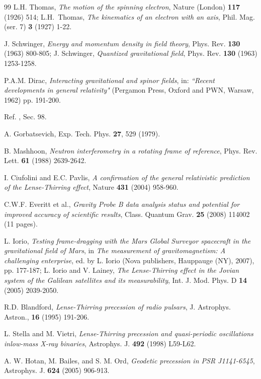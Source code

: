 \documentclass[preprint,showpacs,preprintnumbers,amsmath,amssymb]{revtex4}
\begin{document}
\begin{thebibliography}{99}
L.H. Thomas, {\it The motion of the spinning electron},
Nature (London) {\bf 117} (1926) 514; L.H.~Thomas, 
{\it The kinematics of an electron with an axis},
Phil. Mag. (ser. 7) {\bf 3} (1927) 1-22.

J. Schwinger,
{\it Energy and momentum density in field theory},
Phys. Rev. {\bf 130} (1963) 800-805;
J. Schwinger,
{\it Quantized gravitational field},
Phys. Rev. {\bf 130} (1963) 1253-1258.

P.A.M. Dirac,
{\it Interacting gravitational and spinor fields},
in: {\sl ``Recent developments in general relativity"}
(Pergamon Press, Oxford and PWN, Warsaw, 1962) pp. 191-200.

Ref. \cite{LL}, Sec. 98.

A. Gorbatsevich, Exp. Tech. Phys. {\bf 27}, 529 (1979).

B. Mashhoon,
{\it Neutron interferometry in a rotating frame of reference},
Phys. Rev. Lett. {\bf 61} (1988) 2639-2642.

I. Ciufolini and E.C. Pavlis,
{\it A confirmation of the general
relativistic prediction of the Lense-Thirring effect},
Nature \textbf{431} (2004) 958-960.

C.W.F. Everitt et al.,
{\it Gravity Probe B data analysis status and potential for 
improved accuracy of scientific results},
Class. Quantum Grav. \textbf{25} (2008) 114002 (11 pages).

L. Iorio, {\it Testing frame-dragging with the Mars Global 
Surveyor spacecraft in the gravitational field of Mars}, 
in \emph{The measurement of gravitomagnetism: A
challenging enterprise}, ed. by L. Iorio (Nova publishers,
Hauppauge (NY), 2007), pp. 177-187;
L. Iorio and V. Lainey,
{\it The Lense-Thirring effect in the Jovian system
of the Galilean satellites and its measurability},
Int. J. Mod. Phys. D \textbf{14} (2005) 2039-2050.

R.D. Blandford,
{\it Lense-Thirring precession of radio pulsars},
J. Astrophys. Astron., \textbf{16} (1995) 191-206.

L. Stella and M. Vietri,
{\it Lense-Thirring precession and quasi-periodic 
oscillations inlow-mass X-ray binaries},
Astrophys. J. \textbf{492} (1998) L59-L62.

A. W. Hotan, M. Bailes, and S. M. Ord,
{\it Geodetic precession in PSR J1141-6545},
Astrophys. J. \textbf{624} (2005) 906-913.


\end{thebibliography}
\end{document}
